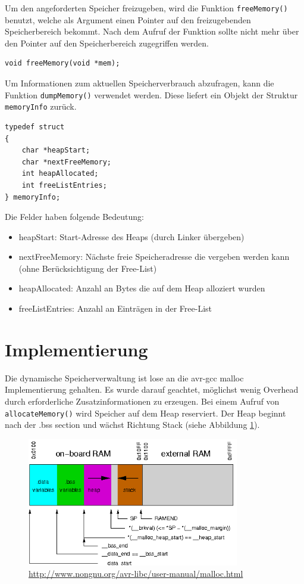 \documentclass[fontsize=12pt, toc=bibliography, notitlepage]{scrreprt}
\begin{document}
Um den angeforderten Speicher freizugeben, wird die Funktion \lstinline$freeMemory()$ benutzt, welche als Argument einen Pointer auf den freizugebenden  Speicherbereich bekommt. Nach dem Aufruf der Funktion sollte nicht mehr über den Pointer auf den Speicherbereich zugegriffen werden.

\begin{lstlisting}[title=memory.h]
void freeMemory(void *mem);
\end{lstlisting}

Um Informationen zum aktuellen Speicherverbrauch abzufragen, kann die Funktion \lstinline$dumpMemory()$ verwendet werden. Diese liefert ein Objekt der Struktur \lstinline$memoryInfo$ zurück.

\newpage

\begin{lstlisting}[title=memory.h]
typedef struct
{
	char *heapStart;
	char *nextFreeMemory;
	int heapAllocated;
	int freeListEntries;
} memoryInfo;
\end{lstlisting}

Die Felder haben folgende Bedeutung:

\begin{itemize}
	\item heapStart: Start-Adresse des Heaps (durch Linker übergeben)
	\item nextFreeMemory: Nächste freie Speicheradresse die vergeben werden kann (ohne Berücksichtigung der Free-List)
	\item heapAllocated: Anzahl an Bytes die auf dem Heap alloziert wurden
	\item freeListEntries: Anzahl an Einträgen in der Free-List
\end{itemize}

\section{Implementierung}
\label{subsec:mem-impl}
Die dynamische Speicherverwaltung ist lose an die avr-gcc malloc Implementierung gehalten. Es wurde darauf geachtet, möglichst wenig Overhead durch erforderliche Zusatzinformationen zu erzeugen. Bei einem Aufruf von \lstinline$allocateMemory()$ wird Speicher auf dem Heap reserviert. Der Heap beginnt nach der .bss section und wächst Richtung Stack (siehe Abbildung \ref{fig:sections}).

\begin{figure}[H]
	\centering
	\includegraphics[width=350px]{images/malloc-std.png}
	\caption{\url{http://www.nongnu.org/avr-libc/user-manual/malloc.html}}
	\label{fig:sections}
\end{figure}
\end{document}
